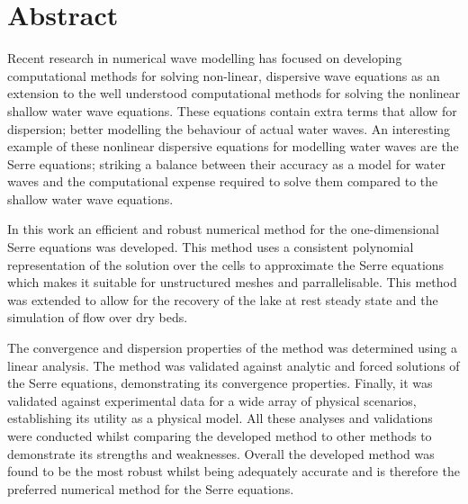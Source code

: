 \chapter*{Abstract}\label{abstract}


Recent research in numerical wave modelling has focused on developing computational methods for solving non-linear, dispersive wave equations as an extension to the well understood computational methods for solving the nonlinear shallow water wave equations. These equations contain extra terms that allow for dispersion; better modelling the behaviour of actual water waves. An interesting example of these nonlinear dispersive equations for modelling water waves are the Serre equations; striking a balance between their accuracy as a model for water waves and the computational expense required to solve them compared to the shallow water wave equations. 

In this work an efficient and robust numerical method for the one-dimensional Serre equations was developed. This method uses a consistent polynomial representation of the solution over the cells to approximate the Serre equations which makes it suitable for unstructured meshes and parrallelisable. This method was extended to allow for the recovery of the lake at rest steady state and the simulation of flow over dry beds.  

The convergence and dispersion properties of the method was determined using a linear analysis. The method was validated against analytic and forced solutions of the Serre equations, demonstrating its convergence properties. Finally, it was validated against experimental data for a wide array of physical scenarios, establishing its utility as a physical model. All these analyses and validations were conducted whilst comparing the developed method to other methods to demonstrate its strengths and weaknesses. Overall the developed method was found to be the most robust whilst being adequately accurate and is therefore the preferred numerical method for the Serre equations.


